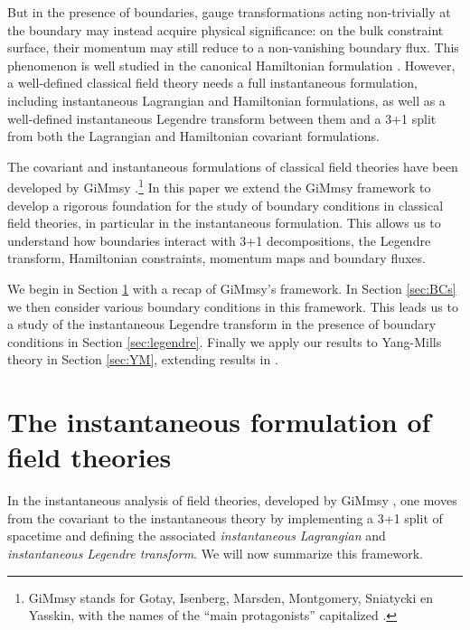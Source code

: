 \documentclass{article}
\theoremstyle{definition}
\begin{document}
But in the presence of boundaries, gauge transformations acting non-trivially at the boundary may instead acquire physical significance: on the bulk constraint surface, their momentum may still reduce to a non-vanishing boundary flux. This phenomenon is well studied in the canonical Hamiltonian formulation \cite{rielloHamiltonianGaugeTheory2024,rielloNullHamiltonianYang2025}. However, a well-defined classical field theory needs a full instantaneous formulation, including instantaneous Lagrangian and Hamiltonian formulations, as well as a well-defined instantaneous Legendre transform between them and a 3+1 split from both the Lagrangian and Hamiltonian covariant formulations. 

The covariant and instantaneous formulations of classical field theories have been developed by GiMmsy \cite{gotayMomentumMapsClassical2004,gotayMomentumMapsClassical2004a,Gotay2006MomentumMA}.\footnote{GiMmsy stands for Gotay, Isenberg, Marsden, Montgomery, Sniatycki en Yasskin, with the names of the ``main protagonists'' capitalized \cite{blohmann}.} In this paper we extend the GiMmsy framework to develop a rigorous foundation for the study of boundary conditions in classical field theories, in particular in the instantaneous formulation. This allows us to understand how boundaries interact with 3+1 decompositions, the Legendre transform, Hamiltonian constraints, momentum maps and boundary fluxes.

We begin in Section \ref{sec:instantaneousformulation} with a recap of GiMmsy's framework. In Section \ref{sec:BCs} we then consider various boundary conditions in this framework. This leads us to a study of the instantaneous Legendre transform in the presence of boundary conditions in Section \ref{sec:legendre}. Finally we apply our results to Yang-Mills theory in Section \ref{sec:YM}, extending results in \cite{Borsboom:2025agn}.


\section{The instantaneous formulation of field theories}\label{sec:instantaneousformulation}

In the instantaneous analysis of field theories, developed by GiMmsy \cite{binz,gotayMomentumMapsClassical2004,gotayMomentumMapsClassical2004a}, one moves from the covariant to the instantaneous theory by implementing a 3+1 split of spacetime and defining the associated \textit{instantaneous Lagrangian} and \textit{instantaneous Legendre transform}. We will now summarize this framework.
\end{document}
